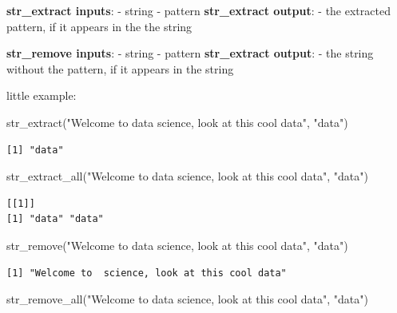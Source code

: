 \documentclass[
  letterpaper,
  DIV=11,
  numbers=noendperiod]{scrartcl}
\newenvironment{Shaded}{\begin{snugshade}}{\end{snugshade}}
\newcommand{\FunctionTok}[1]{\textcolor[rgb]{0.28,0.35,0.67}{#1}}
\newcommand{\NormalTok}[1]{\textcolor[rgb]{0.00,0.23,0.31}{#1}}
\newcommand{\StringTok}[1]{\textcolor[rgb]{0.13,0.47,0.30}{#1}}
\begin{document}
\textbf{str\_extract inputs}: - string - pattern \textbf{str\_extract
output}: - the extracted pattern, if it appears in the the string

\textbf{str\_remove inputs}: - string - pattern \textbf{str\_extract
output}: - the string without the pattern, if it appears in the string

little example:

\begin{Shaded}
\begin{Highlighting}[]
\FunctionTok{str\_extract}\NormalTok{(}\StringTok{"Welcome to data science, look at this cool data"}\NormalTok{, }\StringTok{"data"}\NormalTok{)}
\end{Highlighting}
\end{Shaded}

\begin{verbatim}
[1] "data"
\end{verbatim}

\begin{Shaded}
\begin{Highlighting}[]
\FunctionTok{str\_extract\_all}\NormalTok{(}\StringTok{"Welcome to data science, look at this cool data"}\NormalTok{, }\StringTok{"data"}\NormalTok{)}
\end{Highlighting}
\end{Shaded}

\begin{verbatim}
[[1]]
[1] "data" "data"
\end{verbatim}

\begin{Shaded}
\begin{Highlighting}[]
\FunctionTok{str\_remove}\NormalTok{(}\StringTok{"Welcome to data science, look at this cool data"}\NormalTok{, }\StringTok{"data"}\NormalTok{)}
\end{Highlighting}
\end{Shaded}

\begin{verbatim}
[1] "Welcome to  science, look at this cool data"
\end{verbatim}

\begin{Shaded}
\begin{Highlighting}[]
\FunctionTok{str\_remove\_all}\NormalTok{(}\StringTok{"Welcome to data science, look at this cool data"}\NormalTok{, }\StringTok{"data"}\NormalTok{)}
\end{Highlighting}
\end{Shaded}
\end{document}
